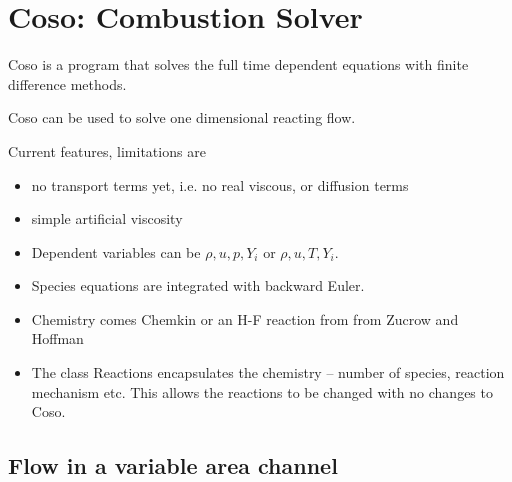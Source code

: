 \documentclass{article}
\begin{document}
\section{Coso: Combustion Solver}

Coso is a program that solves the full time dependent equations with finite difference methods.

Coso can be used to solve one dimensional reacting flow.

\noindent Current features, limitations are
\begin{itemize}
 \item no transport terms yet, i.e. no real viscous, or diffusion terms
 \item simple artificial viscosity
 \item Dependent variables can be $\rho, u, p, Y_i$ or $\rho, u, T, Y_i$.
 \item Species equations are integrated with backward Euler.
 \item Chemistry comes Chemkin or an H-F reaction from from Zucrow and Hoffman
 \item The class Reactions encapsulates the chemistry -- number of species, reaction mechanism etc.
       This allows the reactions to be changed with no changes to Coso.
\end{itemize}


\subsection{Flow in a variable area channel}
\end{document}
